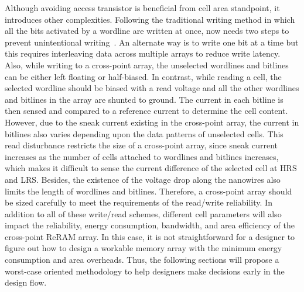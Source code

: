 Although avoiding access transistor is beneficial from cell area standpoint, it
introduces other complexities. Following the traditional writing method in which all 
the bits activated by a wordline are written at once, now needs two steps 
to prevent unintentional writing~\cite{memristor:Cong}. An alternate way is
to write one bit at a time but this requires interleaving data across multiple
arrays to reduce write latency.
Also, while writing to a cross-point array, the unselected wordlines
and bitlines can be either left floating or half-biased. In contrast, while reading
a cell, the selected wordline should be biased with a read
voltage and all the other wordlines and bitlines in the array are shunted
to ground. The current in each bitline is then sensed and compared to a
reference current to determine the cell content. However, due to the sneak
current existing in the cross-point array, the current in bitlines also
varies depending upon the data patterns of unselected cells.
This read disturbance restricts the size of a cross-point array, since
sneak current increases as the number of cells attached to wordlines and
bitlines increases, which makes it difficult to sense the current
difference of the selected cell at HRS and LRS. Besides, the existence of
the voltage drop along the nanowires also limits the length of wordlines
and bitlines. Therefore, a cross-point array should be sized carefully to
meet the requirements of the read/write reliability.
In addition to all of these write/read schemes, different cell parameters
will also impact the reliability, energy consumption, bandwidth, and area
efficiency of the cross-point ReRAM array. In this case, it is not
straightforward for a designer to figure out how to design a workable
memory array with the minimum energy consumption and area overheads. Thus,
the following sections will propose a worst-case oriented methodology to
help designers make decisions early in the design flow.



